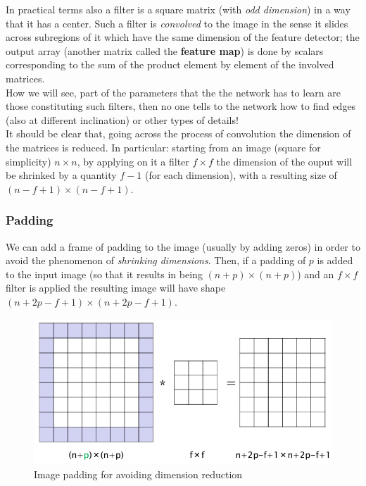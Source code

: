 \noindent
In practical terms also a filter is a square matrix (with \textit{odd dimension}) in a way that it has a center. Such a filter is \textit{convolved} to the image in the sense it slides across subregions of it which have the same dimension of the feature detector; the output array (another matrix called the \textbf{feature map}) is done by scalars corresponding to the sum of the product element by element of the involved matrices. \\
How we will see, part of the parameters that the the network has to learn are those constituting such filters, then no one tells to the network how to find edges (also at different inclination) or other types of details!\\
 It should be clear that, going across the process of convolution the dimension of the matrices is reduced. In particular: starting from an image (square for simplicity) $n\times{n}$, by applying on it a filter $f\times{f}$ the dimension of the ouput will be shrinked by a quantity $f-1$ (for each dimension), with a resulting size of $(n-f+1)\times{(n-f+1)}$.

\subsubsection{Padding}
We can add a frame of padding to the image (usually by adding zeros) in order to avoid the phenomenon of \textit{shrinking dimensions}. Then, if a padding of $p$ is added to the input image (so that it results in being $(n+p)\times(n+p)$) and an $f\times{f}$ filter is applied the resulting image will have shape $(n+2p-f+1)\times{(n+2p-f+1)}$.


\begin{figure}
    \centering
    \includegraphics[scale=0.6]{img/CNN_padding.png}
    \caption{Image padding for avoiding dimension reduction}
\end{figure}

